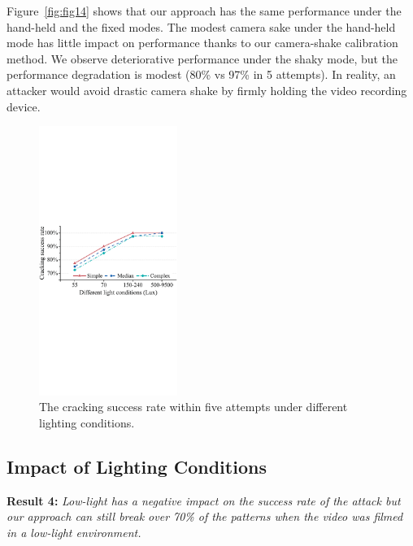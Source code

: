     Figure~\ref{fig:fig14} shows that our approach has the same performance under
    the hand-held and the fixed modes. The modest camera sake under the hand-held mode
    has little impact on performance thanks to our camera-shake calibration method. We observe deteriorative performance
    under the shaky mode, but the performance degradation is modest (80\% vs 97\%
    in 5 attempts). In reality, an attacker would avoid drastic
    camera shake by firmly holding the video recording device.


        \begin{figure}[t!]
            \centering
            \includegraphics[width=0.4\textwidth]{fig/light.pdf}
            \vspace{-2mm}
            \caption{The cracking success rate within five attempts under different lighting conditions.}
            \label{fig:light}
            \vspace{-6mm}
        \end{figure}

    \vspace{-3mm}
    \subsection{Impact of Lighting Conditions \label{sec:light}}
    \noindent \textbf{Result 4:} \emph{Low-light has a negative impact on the success rate of the attack but our approach can still break over 70\% of the patterns when the video was filmed in a low-light environment.}

